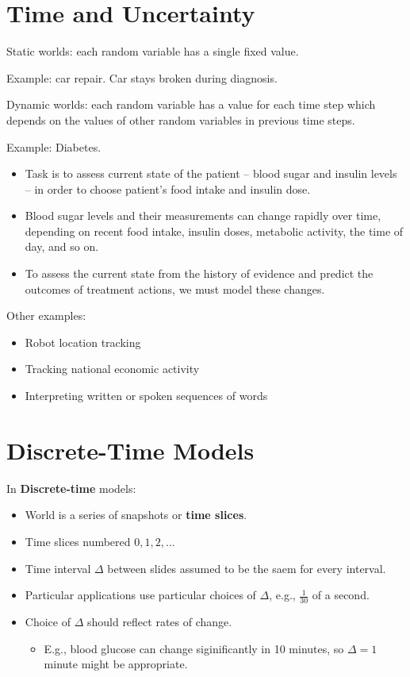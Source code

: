 \documentclass[11pt]{article}
\begin{document}
\section{Time and Uncertainty}
\label{sec:org9fb30bf}

Static worlds: each random variable has a single fixed value.

Example: car repair.  Car stays broken during diagnosis.

Dynamic worlds: each random variable has a value for each time step which depends on the values of other random variables in previous time steps.

Example: Diabetes.

\begin{itemize}
\item Task is to assess current state of the patient -- blood sugar and insulin levels -- in order to choose patient's food intake and insulin dose.

\item Blood sugar levels and their measurements can change rapidly over time, depending on recent food intake, insulin doses, metabolic activity, the time of day, and so on.

\item To assess the current state from the history of evidence and predict the outcomes of treatment actions, we must model these changes.
\end{itemize}


Other examples:

\begin{itemize}
\item Robot location tracking
\item Tracking national economic activity
\item Interpreting written or spoken sequences of words
\end{itemize}
\section{Discrete-Time Models}
\label{sec:org9e295f2}

In \textbf{Discrete-time} models:

\begin{itemize}
\item World is a series of snapshots or \textbf{time slices}.
\item Time slices numbered \(0, 1, 2, \dots\)
\item Time interval \(\Delta\) between slides assumed to be the saem for every interval.
\item Particular applications use particular choices of \(\Delta\), e.g., \(\frac{1}{30}\) of a second.
\item Choice of \(\Delta\) should reflect rates of change.

\begin{itemize}
\item E.g., blood glucose can change siginificantly in 10 minutes, so \(\Delta = 1\) minute might be appropriate.
\end{itemize}
\end{itemize}
\end{document}
